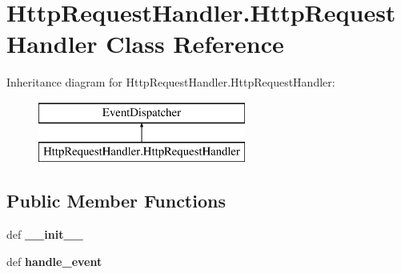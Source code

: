 \hypertarget{class_http_request_handler_1_1_http_request_handler}{\section{Http\-Request\-Handler.\-Http\-Request\-Handler Class Reference}
\label{class_http_request_handler_1_1_http_request_handler}
}
Inheritance diagram for Http\-Request\-Handler.\-Http\-Request\-Handler\-:\begin{figure}[H]
\begin{center}
\leavevmode
\includegraphics[height=2.000000cm]{class_http_request_handler_1_1_http_request_handler}
\end{center}
\end{figure}
\subsection*{Public Member Functions}
\begin{DoxyCompactItemize}
\item 
\hypertarget{class_http_request_handler_1_1_http_request_handler_a4954fb9400047a85dc5475f292159ed4}{def {\bfseries \-\_\-\-\_\-init\-\_\-\-\_\-}}\label{class_http_request_handler_1_1_http_request_handler_a4954fb9400047a85dc5475f292159ed4}

\item 
\hypertarget{class_http_request_handler_1_1_http_request_handler_a02f0499dbbcb23259ddb69e5be9d4989}{def {\bfseries handle\-\_\-event}}\label{class_http_request_handler_1_1_http_request_handler_a02f0499dbbcb23259ddb69e5be9d4989}

\end{DoxyCompactItemize}
